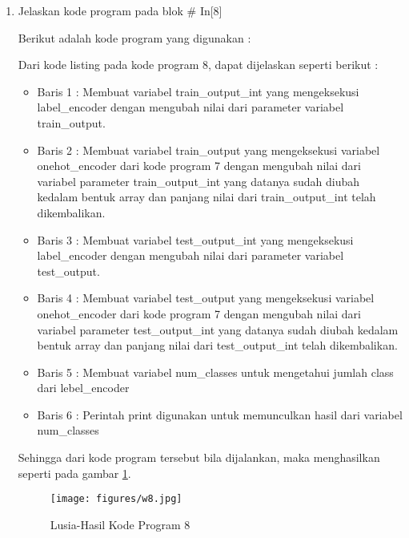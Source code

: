 \begin{enumerate}
\item Jelaskan kode program pada blok \# In[8]
	\par Berikut adalah kode program yang digunakan :
	
	\par Dari kode listing pada kode program 8, dapat dijelaskan seperti berikut :
	\begin{itemize}
	\item Baris 1	: Membuat variabel train\_output\_int yang mengeksekusi label\_encoder dengan mengubah nilai dari parameter variabel train\_output.
	\item Baris 2	: Membuat variabel train\_output yang mengeksekusi variabel onehot\_encoder dari kode program 7 dengan mengubah nilai dari variabel parameter train\_output\_int yang datanya sudah diubah kedalam bentuk array dan panjang nilai dari train\_output\_int telah dikembalikan.
	\item Baris 3	: Membuat variabel test\_output\_int yang mengeksekusi label\_encoder dengan mengubah nilai dari parameter variabel test\_output.
	\item Baris 4	: Membuat variabel test\_output yang mengeksekusi variabel onehot\_encoder dari kode program 7 dengan mengubah nilai dari variabel parameter test\_output\_int yang datanya sudah diubah kedalam bentuk array dan panjang nilai dari test\_output\_int telah dikembalikan.
	\item Baris 5	: Membuat variabel num\_classes untuk mengetahui jumlah class dari lebel\_encoder
	\item Baris 6	: Perintah print digunakan untuk memunculkan hasil dari variabel num\_classes
	\end{itemize}
	\par Sehingga dari kode program tersebut bila dijalankan, maka menghasilkan seperti pada gambar \ref{7B8}.
		\begin{figure}[!hbtp]
		\centering
		\texttt{[image: figures/w8.jpg]}
		\caption{Lusia-Hasil Kode Program 8}
		\label{7B8}
		\end{figure}
		

\end{enumerate}

